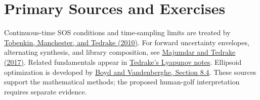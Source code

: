 \section{Primary Sources and Exercises}

Continuous-time SOS conditions and time-sampling limits are treated by \href{https://arxiv.org/abs/1010.3013}{Tobenkin, Manchester, and Tedrake (2010)}. For forward uncertainty envelopes, alternating synthesis, and library composition, see \href{https://groups.csail.mit.edu/robotics-center/public_papers/Majumdar16.pdf}{Majumdar and Tedrake (2017)}. Related fundamentals appear in \href{https://underactuated.mit.edu/lyapunov.html}{Tedrake's Lyapunov notes}. Ellipsoid optimization is developed by \href{https://web.stanford.edu/~boyd/cvxbook/bv_cvxbook.pdf}{Boyd and Vandenberghe, Section 8.4}. These sources support the mathematical methods; the proposed human-golf interpretation requires separate evidence.

